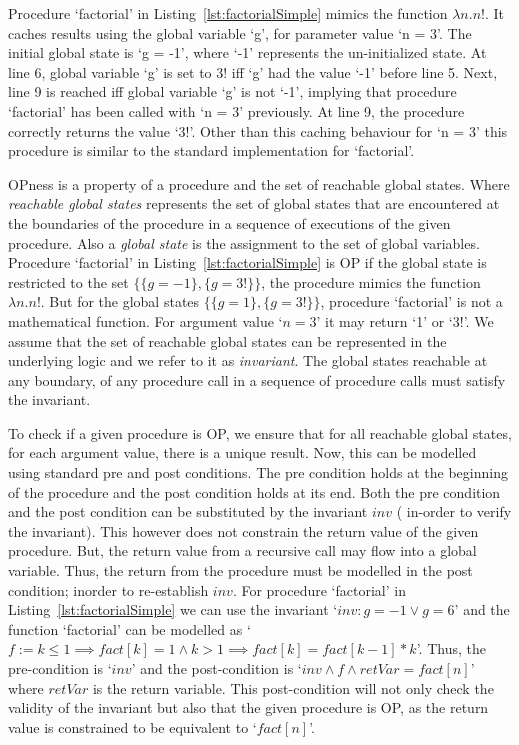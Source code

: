 \documentclass{llncs}
\newcommand{\inv}{\mathit{inv}}
\newcommand{\retVar}{\textit{retVar}}
\newcommand{\fact}{\mathit{fact}}
\begin{document}
Procedure `factorial' in Listing~\ref{lst:factorialSimple} mimics the
function $\lambda n. n!$. It caches results using the global variable
`g', for parameter value `n = 3'. The initial global state is `g =
-1', where `-1' represents the un-initialized state. At line 6, global
variable `g' is set to 3! iff `g' had the value `-1' before line
5. Next, line 9 is reached iff global variable `g' is not `-1',
implying that procedure `factorial' has been called with `n = 3'
previously. At line 9, the procedure correctly returns the value
`3!'. Other than this caching behaviour for `n = 3' this procedure is
similar to the standard implementation for `factorial'.

OPness is a property of a procedure and the set of reachable global
states. Where \textit{reachable global states} represents the set of
global states that are encountered at the boundaries of the procedure
in a sequence of executions of the given procedure. Also a
\textit{global state} is the assignment to the set of global
variables. Procedure `factorial' in Listing~\ref{lst:factorialSimple}
is OP if the global state is restricted to the set $\{\{g = -1\}, \{g
= 3!\}\}$, the procedure mimics the function $\lambda n.n!$. But for
the global states $\{\{g = 1\}, \{g = 3!\}\}$, procedure `factorial'
is not a mathematical function. For argument value `$n = 3$' it may
return `1' or `3!'.  We assume that the set of reachable global states
can be represented in the underlying logic and we refer to it as
\textit{invariant}.  The global states reachable at any boundary, of
any procedure call in a sequence of procedure calls must satisfy the
invariant.

To check if a given procedure is OP, we ensure that for all reachable
global states, for each argument value, there is a unique result. Now,
this can be modelled using standard pre and post conditions. The pre
condition holds at the beginning of the procedure and the post
condition holds at its end. Both the pre condition and the post
condition can be substituted by the invariant $\inv$ ( in-order to
verify the invariant). This however does not constrain the return
value of the given procedure. But, the return value from a recursive
call may flow into a global variable. Thus, the return from the
procedure must be modelled in the post condition; inorder to
re-establish $\inv$.  For procedure `factorial' in
Listing~\ref{lst:factorialSimple} we can use the invariant `$\inv : g
= -1 \vee g = 6$' and the function `factorial' can be modelled as `$ f
:= k \leq 1 \implies \fact[k] = 1 \wedge k >1 \implies \fact[k] =
\fact[k-1]*k$'. Thus, the pre-condition is `$\inv$' and the
post-condition is `$\inv \wedge f \wedge \retVar = fact[n]$' where
$\retVar$ is the return variable. This post-condition will not only
check the validity of the invariant but also that the given procedure
is OP, as the return value is constrained to be equivalent to
`$fact[n]$'.
\end{document}
